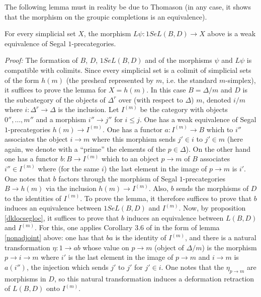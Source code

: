 The following lemma must in reality be due to Thomason
\cite{ThomasonLimits}
(in any case,
it shows that the morphism on the groupic completions is an
equivalence).

\begin{lemma}
\label{bd}
For every simplicial set $X$, the morphism
$L\psi : 1SeL(B,D)\rightarrow X$ above is a weak equivalence of
Segal $1$-precategories.
\end{lemma}
{\em Proof:}
The formation of $B$, $D$, $1SeL(B,D)$ and of the morphisms $\psi$ and $L\psi$
is compatible with colimits. Since every simplicial set is a colimit
of simplicial sets of the form $h(m)$ (the presheaf represented by
$m$, i.e. the standard $m$-simplex), it suffices to prove the lemma for
$X=h(m)$. In this case $B=\Delta /m$ and $D$ is the subcategory of the objects of
$\Delta ^r$ over (with respect to $\Delta$) $m$, denoted $i/m$ where $i:
\Delta ^r\rightarrow \Delta $ is the inclusion. Let $I^{(m)}$ be the category
with objects $0'',\ldots , m''$ and a morphism $i''\rightarrow j''$ for
$i\leq j$. One has a weak equivalence of Segal $1$-precategories
$h(m)\rightarrow I^{(m)}$.
One has a functor $a: I^{(m)}\rightarrow B$ which to $i''$ associates the object
$i\rightarrow m$ where this morphism sends $j'\in i$ to $j'\in m$
(here again, we denote with a ``prime'' the elements of the $p\in \Delta$).
On the other hand one has a functor $b: B\rightarrow I^{(m)}$ which to an object
$p\rightarrow m$ of $B$ associates $i''\in I^{(m)}$ where (for the same
$i$) the last element in the image of $p\rightarrow m$ is $i'$.
One notes that $b$ factors through the morphism of Segal $1$-precategories
$B\rightarrow h(m)$ via the inclusion $h(m)\rightarrow I^{(m)}$. Also, $b$
sends the morphisms of $D$ to the identities of $I^{(m)}$. To prove the
lemma, it therefore suffices to prove that $b$ induces an equivalence between
$1SeL(B,D)$ and $I^{(m)}$. Now, by proposition \ref{dklocsegloc}, it
suffices to prove that $b$ induces an equivalence
between $L(B,D)$ and $I^{(m)}$. For this, one applies Corollary 3.6 of
\cite{DwyerKan2} in the form of lemma \ref{nonadjoint} above: one has that
$ba$ is the identity of $I^{(m)}$, and there is a natural
transformation $\eta : 1\rightarrow ab$ whose value on $p\rightarrow m$
(object of $\Delta /m$) is the morphism $p\rightarrow i \rightarrow m$ where $i'$
is the last element in the image of $p\rightarrow m$ and $i\rightarrow
m$ is $a(i'')$, the injection which sends $j'$ to $j'$ for $j'\in i$.
One notes that the $\eta _{p\rightarrow m}$ are morphisms in $D$, so
this natural transformation induces a deformation retraction of $L(B,D)$ onto
$I^{(m)}$.
\eop


